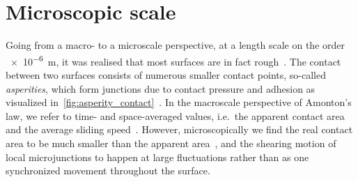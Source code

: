 










\section{Microscopic scale}\label{sec:microscale}
Going from a macro- to a microscale perspective, at a length scale on the order
\SI{e-6}{m}, it was realised that most surfaces are in fact rough~\cite{mo_friction_2009}. The contact between two surfaces consists of numerous
smaller contact points, so-called \textit{asperities}, which form junctions due to contact pressure and adhesion as visualized in~\cref{fig:asperity_contact}~\cite{kim_nano-scale_2009}. In the macroscale perspective of Amonton's law, we refer to time- and space-averaged values, i.e.\ the apparent contact area and the average
sliding speed~\cite{gao_frictional_2004}. However, microscopically we find the
real contact area to be much smaller than the apparent area~\cite{kim_nano-scale_2009}, and the shearing motion of local microjunctions to happen at large fluctuations rather than as one synchronized movement throughout the surface. 

